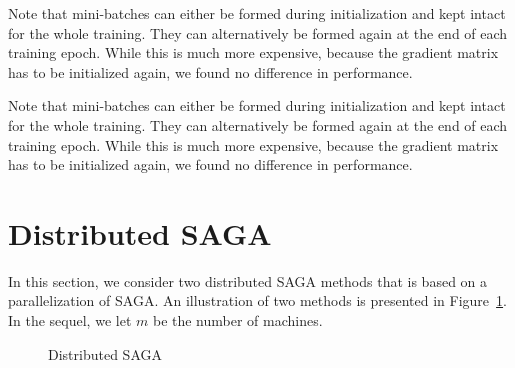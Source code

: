 \documentclass[a4paper,11pt]{article}
\begin{document}
Note that mini-batches can either be formed during initialization and kept
intact for the whole training. They can alternatively be formed again at the end
of each training epoch. While this is much more expensive, because the gradient
matrix has to be initialized again, we found no difference in performance.

Note that mini-batches can either be formed during initialization and kept
intact for the whole training. They can alternatively be formed again at the end
of each training epoch. While this is much more expensive, because the gradient
matrix has to be initialized again, we found no difference in performance.

%

\section{Distributed SAGA}

In this section, we consider two distributed SAGA methods that is based on a parallelization of SAGA. An illustration of two methods is presented in Figure~\ref{2figs-show}. In the sequel, we let $m$ be the number of machines.

\begin{figure} [bt]
	\centering
	 \hspace{0pt}
	\caption{Distributed SAGA}
	\label{2figs-show}
\end{figure}
\end{document}
